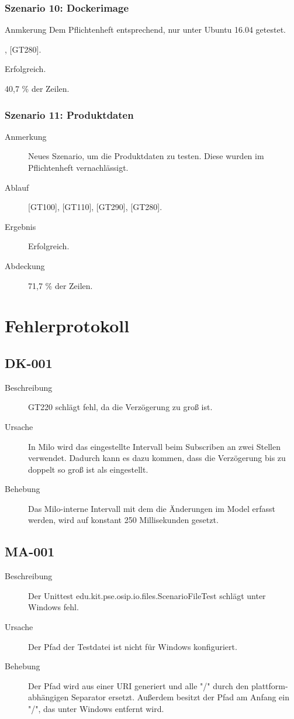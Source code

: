 \documentclass[parskip=full]{scrartcl}
\begin{document}
\subsubsection{Szenario 10: Dockerimage}
\begin{description}
	\item{Anmkerung} Dem Pflichtenheft entsprechend, nur unter Ubuntu 16.04 getestet.
	\item[Ablauf] [GT130], [GT280].
	\item[Ergebnis] Erfolgreich.
	\item[Abdeckung] 40,7 \% der Zeilen.
\end{description}

\subsubsection{Szenario 11: Produktdaten}
\begin{description}
	\item[Anmerkung] Neues Szenario, um die Produktdaten zu testen. Diese wurden im Pflichtenheft vernachlässigt.
	\item[Ablauf] [GT100], [GT110], [GT290], [GT280].
	\item[Ergebnis] Erfolgreich.
	\item[Abdeckung] 71,7 \% der Zeilen.
\end{description}

\section{Fehlerprotokoll}

\subsection{DK-001}
\begin{description}
	\item[Beschreibung] GT220 schlägt fehl, da die Verzögerung zu groß ist.
	\item[Ursache] In Milo wird das eingestellte Intervall beim Subscriben an zwei Stellen verwendet. Dadurch kann es dazu kommen, dass die Verzögerung bis zu doppelt so groß ist als eingestellt.
	\item[Behebung] Das Milo-interne Intervall mit dem die Änderungen im Model erfasst werden, wird auf konstant 250 Millisekunden gesetzt.
\end{description}

\subsection{MA-001}
\begin{description}
	\item[Beschreibung] Der Unittest edu.kit.pse.osip.io.files.ScenarioFileTest schlägt unter Windows fehl.
	\item[Ursache] Der Pfad der Testdatei ist nicht für Windows konfiguriert.
	\item[Behebung] Der Pfad wird aus einer URI generiert und alle "/" durch den plattform-abhängigen Separator ersetzt. Außerdem besitzt der Pfad am Anfang ein "/", das unter Windows entfernt wird.
\end{description}
\end{document}

